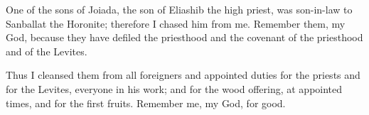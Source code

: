  One of the sons of Joiada, the son of Eliashib the high
priest, was son-in-law to Sanballat the Horonite; therefore I chased him
from me.  Remember them, my God, because they have
defiled the priesthood and the covenant of the priesthood and of the
Levites.

 Thus I cleansed them from all foreigners and appointed
duties for the priests and for the Levites, everyone in his work;
 and for the wood offering, at appointed times, and for
the first fruits. Remember me, my God, for good.
